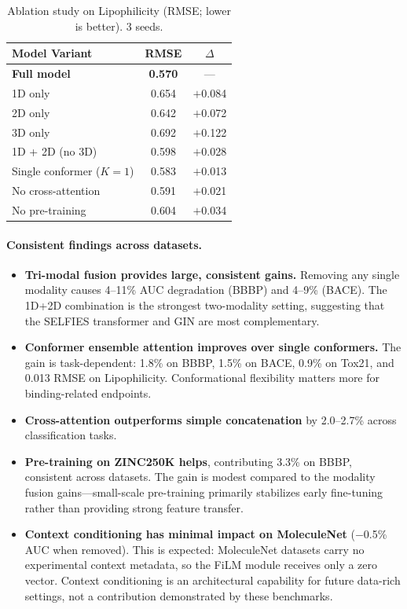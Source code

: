 \documentclass[11pt]{article}
\begin{document}
\begin{table}[t]
    \centering
    \caption{Ablation study on Lipophilicity (RMSE; lower is better). 3 seeds.}
    \label{tab:ablation_lipo}
    \small
    \begin{tabular}{lcc}
        \toprule
        \textbf{Model Variant} & \textbf{RMSE} & \textbf{$\Delta$} \\
        \midrule
        \textbf{Full model} & \textbf{0.570} & --- \\
        \midrule
        1D only & 0.654 & $+$0.084 \\
        2D only & 0.642 & $+$0.072 \\
        3D only & 0.692 & $+$0.122 \\
        1D + 2D (no 3D) & 0.598 & $+$0.028 \\
        Single conformer ($K\!=\!1$) & 0.583 & $+$0.013 \\
        No cross-attention & 0.591 & $+$0.021 \\
        No pre-training & 0.604 & $+$0.034 \\
        \bottomrule
    \end{tabular}
\end{table}

\paragraph{Consistent findings across datasets.}
\begin{itemize}[leftmargin=*,itemsep=2pt]
    \item \textbf{Tri-modal fusion provides large, consistent gains.} Removing any single modality causes 4--11\% AUC degradation (BBBP) and 4--9\% (BACE). The 1D+2D combination is the strongest two-modality setting, suggesting that the SELFIES transformer and GIN are most complementary.
    \item \textbf{Conformer ensemble attention improves over single conformers.} The gain is task-dependent: 1.8\% on BBBP, 1.5\% on BACE, 0.9\% on Tox21, and 0.013 RMSE on Lipophilicity. Conformational flexibility matters more for binding-related endpoints.
    \item \textbf{Cross-attention outperforms simple concatenation} by 2.0--2.7\% across classification tasks.
    \item \textbf{Pre-training on ZINC250K helps}, contributing 3.3\% on BBBP, consistent across datasets. The gain is modest compared to the modality fusion gains---small-scale pre-training primarily stabilizes early fine-tuning rather than providing strong feature transfer.
    \item \textbf{Context conditioning has minimal impact on MoleculeNet} ($-$0.5\% AUC when removed). This is expected: MoleculeNet datasets carry no experimental context metadata, so the FiLM module receives only a zero vector. Context conditioning is an architectural capability for future data-rich settings, not a contribution demonstrated by these benchmarks.
\end{itemize}
\end{document}
